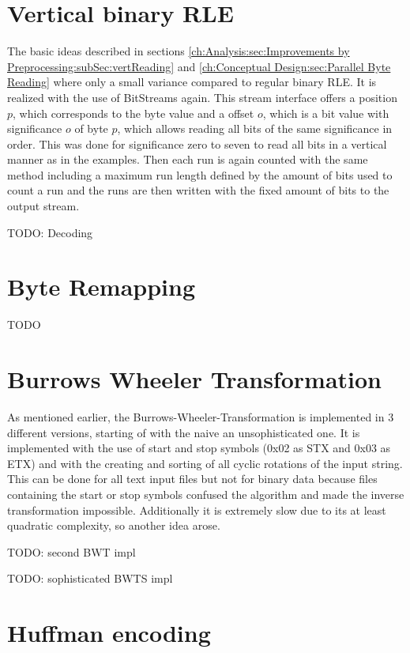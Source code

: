 \section{Vertical binary RLE}
\par{
	The basic ideas described in sections \ref{ch:Analysis:sec:Improvements by Preprocessing:subSec:vertReading} and \ref{ch:Conceptual Design:sec:Parallel Byte Reading} where only a small variance compared to regular binary RLE. It is realized with the use of BitStreams again. This stream interface offers a position $p$, which corresponds to the byte value and a offset $o$, which is a bit value with significance $o$ of byte $p$, which allows reading all bits of the same significance in order. This was done for significance zero to seven to read all bits in a vertical manner as in the examples. Then each run is again counted with the same method including a maximum run length defined by the amount of bits used to count a run and the runs are then written with the fixed amount of bits to the output stream.
}
\par{
	TODO: Decoding
}
\section{Byte Remapping}
\par{
	TODO
}
\section{Burrows Wheeler Transformation}
\par{
	As mentioned earlier, the Burrows-Wheeler-Transformation is implemented in 3 different versions, starting of with the naive an unsophisticated one. It is implemented with the use of start and stop symbols (0x02 as STX and 0x03 as ETX) and with the creating and sorting of all cyclic rotations of the input string. This can be done for all text input files but not for binary data because files containing the start or stop symbols confused the algorithm and made the inverse transformation impossible. Additionally it is extremely slow due to its at least quadratic complexity, so another idea arose.
}
\par{
	TODO: second BWT impl
}

\par{
	TODO: sophisticated BWTS impl
}
\section{Huffman encoding}

